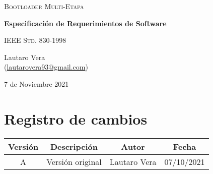 \documentclass[12pt,a4paper]{article}
\makeatletter
\def\Author{Lautaro Vera}
\def\Email{lautarovera93@gmail.com}
\def\Title{Bootloader Multi-Etapa}
\makeatother
\begin{document}
	\begin{titlepage}
		\centering
		{\scshape\Huge \Title \par}
		\vspace{5cm}
		{\bfseries\LARGE Especificación de Requerimientos de Software \par}
		\vspace{1cm}
		{\scshape\Large IEEE Std. 830-1998 \par}
		\vfill
		{\Large \Author \\ (\href{mailto:\Email}{\Email})\par}
		\vfill
		{7 de Noviembre 2021 \par}
	\end{titlepage}


\section*{Registro de cambios}
\label{sec:changelog}


\begin{table}[ht]
\label{tab:changelog}
	\centering
	\begin{tabularx}{\linewidth}{@{}|c|X|c|c|@{}}
	\hline
	\rowcolor[HTML]{C0C0C0} 
	Versión & \multicolumn{1}{c|}{\cellcolor[HTML]{C0C0C0}Descripción} & Autor       & Fecha      \\ \hline
	A      & Versión original                                          & \Author & 07/10/2021 \\ \hline
	\end{tabularx}
\end{table}

\pagebreak

\tableofcontents
\end{document}
